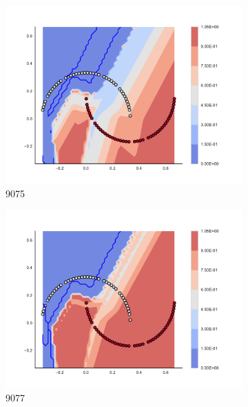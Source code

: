 \begin{figure}[h]
\begin{subfigure}[b]{0.09\textwidth}
    \includegraphics[clip, trim=2.35cm 1.75cm 4.5cm 0cm,width=\textwidth]{img/convergence/9075.pdf}
    \caption{9075}
    \label{fig:convergence_9075}
\end{subfigure}
%
\begin{subfigure}[b]{0.09\textwidth}
    \includegraphics[clip, trim=2.35cm 1.75cm 4.5cm 0cm,width=\textwidth]{img/convergence/9077.pdf}
    \caption{9077}
    \label{fig:convergence_9077}
\end{subfigure}
%
\begin{subfigure}[b]{0.09\textwidth}

\end{subfigure}
\end{figure}
